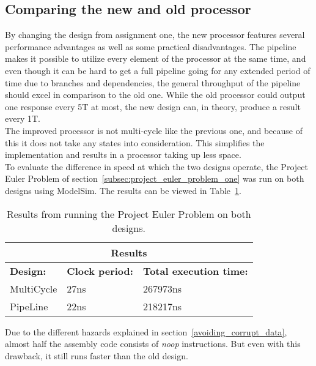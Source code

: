 


\subsection{Comparing the new and old processor}

By changing the design from assignment one, the new processor features several performance advantages as well as some practical disadvantages. The pipeline makes it possible to utilize every element of the processor at the same time, and even though it can be hard to get a full pipeline going for any extended period of time due to branches and dependencies, the  general throughput of the pipeline should excel in comparison to the old one. While the old processor could output one response every 5T at most, the new design can, in theory, produce a result every 1T.\\

The improved processor is not multi-cycle like the previous one, and because of this it does not take any states into consideration. This simplifies the implementation and results in a processor taking up less space.\\

To evaluate the difference in speed at which the two designs operate, the Project Euler Problem of section~\ref{subsec:project_euler_problem_one} was run on both designs using ModelSim. The results can be viewed in Table~\ref{table:results}.
\\
\begin{table}[!htb]
\centering
\begin{tabular}{|l|l|l|} \hline
\multicolumn{3}{|c|}{Results} \\ \hline
\multirow{1}{*}{\bf Design:} & {\bf Clock period:} & {\bf Total execution time:} \\ \hline
\multirow{1}{*}{MultiCycle} & 27ns & 267973ns \\ \hline
\multirow{1}{*}{PipeLine} & 22ns & 218217ns \\ \hline
\end{tabular}
\caption{Results from running the Project Euler Problem on both designs.}
\label{table:results}
\end{table}

Due to the different hazards explained in section~\ref{avoiding_corrupt_data}, almost half the assembly code consists of \emph{noop} instructions. But even with this drawback, it still runs faster than the old design.